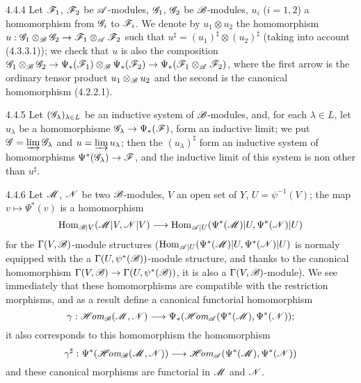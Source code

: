 \begin{env}{4.4.4}
\label{env-0.4.4.4}
Let $\mathscr{F}_1$, $\mathscr{F}_2$ be $\mathscr{A}$-modules, $\mathscr{G}_1$, $\mathscr{G}_2$ be $\mathscr{B}$-modules,
$u_i$ ($i=1,2$) a homomorphism from $\mathscr{G}_i$ to $\mathscr{F}_i$. We denote by $u_1\otimes u_2$
the homomorphism $u:\mathscr{G}_1\otimes_\mathscr{B}\mathscr{G}_2\to\mathscr{F}_1\otimes_\mathscr{A}\mathscr{F}_2$ such
that $u^\sharp=(u_1)^\sharp\otimes(u_2)^\sharp$ (taking into account (4.3.3.1)); we check
that $u$ is also the composition
$\mathscr{G}_1\otimes_\mathscr{B}\mathscr{G}_2\to\Psi_*(\mathscr{F}_1)\otimes_\mathscr{B}\Psi_*(\mathscr{F}_2)
\to\Psi_*(\mathscr{F}_1\otimes_\mathscr{A}\mathscr{F}_2)$, where the first arrow is the ordinary tensor
product $u_1\otimes_\mathscr{B}u_2$ and the second is the canonical homomorphism (4.2.2.1).
\end{env}

\begin{env}{4.4.5}
\label{env-0.4.4.5}
Let $(\mathscr{G}_\lambda)_{\lambda\in L}$ be an inductive system of $\mathscr{B}$-modules, and, for
each $\lambda\in L$, let $u_\lambda$ be a homomorphisme $\mathscr{G}_\lambda\to\Psi_*(\mathscr{F})$,
form an inductive limit; we put $\mathscr{G}=\varinjlim\mathscr{G}_\lambda$ and
$u=\varinjlim u_\lambda$; then the $(u_\lambda)^\sharp$ form an inductive system of
homomorphisms $\Psi^*(\mathscr{G}_\lambda)\to\mathscr{F}$, and the inductive limit of this system is
non other than $u^\sharp$.
\end{env}

\begin{env}{4.4.6}
\label{env-0.4.6.6}
Let $\mathscr{M}$, $\mathscr{N}$ be two $\mathscr{B}$-modules, $V$ an open set of $Y$, $U=\psi^{-1}(V)$; the
map $v\mapsto\Psi^*(v)$ is a homomorphism
\[
  {\mathop{\mathrm{Hom}}\nolimits}_{\mathscr{B}|V}(\mathscr{M}|V,\mathscr{N}|V)
  \longrightarrow{\mathop{\mathrm{Hom}}\nolimits}_{\mathscr{A}|U}(\Psi^*(\mathscr{M})|U,\Psi^*(\mathscr{N})|U)
\]
for the $\Gamma(V,\mathscr{B})$-module structures
(${\mathop{\mathrm{Hom}}\nolimits}_{\mathscr{A}|U}(\Psi^*(\mathscr{M})|U,\Psi^*(\mathscr{N})|U)$ is normaly equipped with the a
$\Gamma(U,\psi^*(\mathscr{B}))$-module structure, and thanks to the canonical homomorphism
 $\Gamma(V,\mathscr{B})\to\Gamma(U,\psi^*(\mathscr{B}))$, it is also a
$\Gamma(V,\mathscr{B})$-module). We see immediately that these homomorphisms are compatible with
the restriction morphisms, and as a result define a canonical functorial homomorphism
\[
  \gamma:\mathscr{H}\!\textit{om}_\mathscr{B}(\mathscr{M},\mathscr{N})
  \longrightarrow\Psi_*(\mathscr{H}\!\textit{om}_\mathscr{A}(\Psi^*(\mathscr{M}),\Psi^*(\mathscr{N}));
\]
it also corresponds to this homomorphism the homomorphism
\[
  \gamma^\sharp:\Psi^*(\mathscr{H}\!\textit{om}_\mathscr{B}(\mathscr{M},\mathscr{N}))
  \longrightarrow\mathscr{H}\!\textit{om}_\mathscr{A}(\Psi^*(\mathscr{M}),\Psi^*(\mathscr{N}))
\]
and these canonical morphisms are functorial in $\mathscr{M}$ and $\mathscr{N}$.
\end{env}

